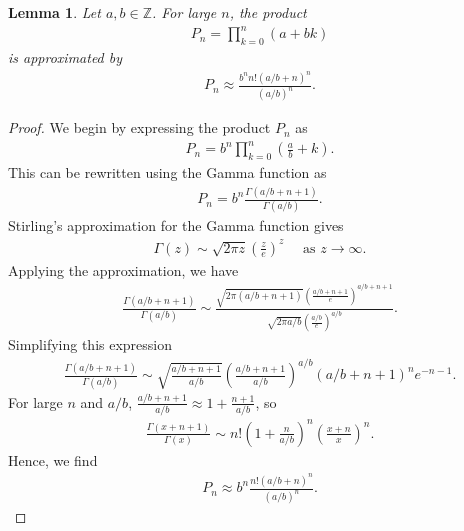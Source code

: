 \documentclass[10pt,a4paper]{article}
\theoremstyle{plain}
\newtheorem{lemma}{Lemma}[section]
\newcommand{\Z}{\mathbb{Z}}
\begin{document}
\begin{lemma} \label{proof:pochapprox1}
Let $a, b \in \Z$. For large $n$, the product 
\begin{align*}
P_n = \prod_{k=0}^n (a+bk)
\end{align*}
is approximated by
\begin{align*}
P_n \approx \frac{b^n n! (a/b+n)^n}{(a/b)^n} .
\end{align*}
\end{lemma}
\begin{proof}
We begin by expressing the product $P_n$ as
\begin{align*}
P_n = b^n \prod_{k=0}^n \left(\frac{a}{b} + k\right) .
\end{align*}
This can be rewritten using the Gamma function as
\begin{align*}
P_n = b^n \frac{\Gamma(a/b + n + 1)}{\Gamma(a/b)}.
\end{align*}
Stirling's approximation for the Gamma function gives
\begin{align*}
\Gamma(z) \sim \sqrt{2\pi z} \left(\frac{z}{e}\right)^z \quad \text{ as } z \to \infty .
\end{align*}
Applying the approximation, we have
\begin{align*}
\frac{\Gamma(a/b+n+1)}{\Gamma(a/b)} \sim \frac{\sqrt{2\pi(a/b+n+1)} \left(\frac{a/b+n+1}{e}\right)^{a/b+n+1}}{\sqrt{2\pi a/b} \left(\frac{a/b}{e}\right)^{a/b}} .
\end{align*}
Simplifying this expression
\begin{align*}
\frac{\Gamma(a/b+n+1)}{\Gamma(a/b)} \sim \sqrt{\frac{a/b+n+1}{a/b}} \left(\frac{a/b+n+1}{a/b}\right)^{a/b} (a/b+n+1)^n e^{-n-1}.
\end{align*}
For large $n$ and $a/b$, $\frac{a/b+n+1}{a/b} \approx 1 + \frac{n+1}{a/b}$, so
\begin{align*}
\frac{\Gamma(x+n+1)}{\Gamma(x)} \sim n! \left(1 + \frac{n}{a/b}\right)^n \left(\frac{x+n}{x}\right)^n.
\end{align*}
Hence, we find
\begin{align*}
P_n \approx b^n \frac{n! (a/b+n)^n}{(a/b)^n}.
\end{align*}
\end{proof}
\end{document}
